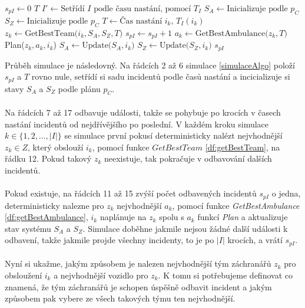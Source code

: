 \begin{algorithm}
  \begin{algorithmic}[1]  %
    \State $s_{pI} \gets 0$
    \State $T$ 
    \State $I' \gets \mbox{Setřídí $I$ podle času nastání, pomocí $T_I$}$
    \State $S_A \gets \mbox{Inicializuje podle $p_C$}$
    \State $S_Z \gets \mbox{Inicializuje podle $p_C$}$
      \State $T \gets \mbox{Čas nastání $i_k$, $T_I(i_k)$}$
      \State $z_k \gets \mbox{GetBestTeam($i_k, S_A, S_Z, T$)}$
        \State $s_{pI} \gets s_{pI} + 1$
        \State $a_k \gets \mbox{GetBestAmbulance($z_k, T$)}$
        \State Plan($z_k, a_k, i_k$)
        \State $S_A \gets \mbox{Update($S_A, i_k$)}$
        \State $S_Z \gets \mbox{Update($S_Z, i_k$)}$
      \EndIf
    \EndFor
    \State \Return $s_{pI}$
  \EndFunction
  \end{algorithmic}
  \caption{}
  \label{simulaceAlgo}
\end{algorithm}

\vspace*{15px}

Průběh simulace je následovný. 
Na řádcích 2 až 6 simulace \ref{simulaceAlgo} položí $s_{pI}$ a $T$ rovno nule, setřídí si sadu incidentů podle časů nastání
a incicializuje si stavy $S_A$ a $S_Z$ podle plánu $p_C$.
\\
\\
Na řádcích 7 až 17 odbavuje události, takže se pohybuje po krocích v časech nastání incidentů od nejdřívějšího po poslední.
V každém kroku simulace $k \in \{ 1, 2, \dots , |I|\}$ se simulace první pokusí deterministicky nalézt nejvhodnější $z_k \in Z$, který obslouží $i_k$,
pomocí funkce $\textit{GetBestTeam}$ \ref{df:getBestTeam}, na řádku 12.
Pokud takový $z_k$ neexistuje, tak pokračuje v odbavování dalších incidentů.
\\
\\
Pokud existuje, na řádcích 11 až 15 zvýší počet odbavených incidentů $s_{pI}$ o jedna,
deterministicky nalezne pro $z_k$ nejvhodnější $a_k$, pomocí funkce \textit{GetBestAmbulance} \ref{df:getBestAmbulance},
$i_k$ naplánuje na $z_k$ spolu s $a_k$ funkcí \textit{Plan} a aktualizuje stav systému $S_A$ a $S_Z$.
Simulace doběhne jakmile nejsou žádné další události k odbavení, takže jakmile projde všechny incidenty, to je po $|I|$ krocích, a vrátí $s_{pI}$.
\\
\\
Nyní si ukažme, jakým způsobem je nalezen nejvhodnější tým záchranářů $z_k$ pro obsloužení $i_k$ a nejvhodnější vozidlo pro $z_k$.
K tomu si potřebujeme definovat co znamená, že tým záchranářů je schopen úspěšně odbavit incident a jakým způsobem pak vybere ze všech takových týmu ten nejvhodnější.


